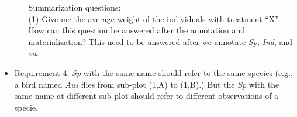 \documentclass[10pt]{article}
\begin{document}
\begin{itemize}
\begin{itemize}

Summarization questions: \\
(1) Give me the average weight of the individuals with treatment ``X''. 
How can this question be answered after the annotation and materialization? 
This need to be answered after we annotate {\em Sp}, {\em Ind}, and {\em wt}. 
\end{itemize}

\item Requirement 4:  {\em Sp} with the same name should refer to the same species (e.g., a bird named {\em Aus} flies from sub-plot (1,A) to (1,B).)  
But the {\em Sp} with the same name at different sub-plot should refer to different observations of a specie.


\end{itemize}
\end{document}
